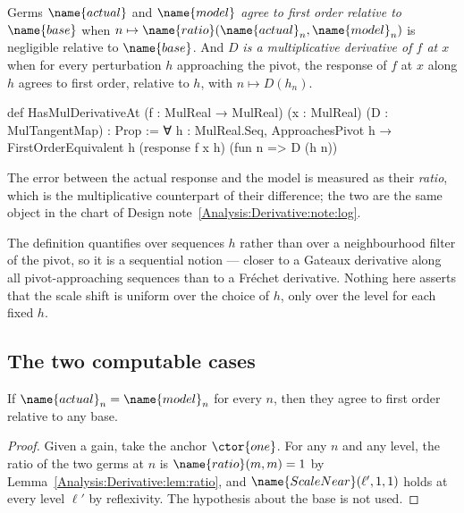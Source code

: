 \begin{definition}
\label{Analysis:Derivative:def:firstorder}
\label{Analysis:Derivative:def:hasderiv}
Germs $\name{actual}$ and $\name{model}$ \emph{agree to first order relative to}
$\name{base}$ when $n \mapsto \name{ratio}(\name{actual}_n, \name{model}_n)$ is
negligible relative to $\name{base}$.  And $D$ \emph{is a multiplicative
derivative of $f$ at $x$} when for every perturbation $h$ approaching the
pivot, the response of $f$ at $x$ along $h$ agrees to first order, relative to
$h$, with $n \mapsto D(h_n)$.
\end{definition}

\begin{leancode}
def HasMulDerivativeAt
    (f : MulReal → MulReal) (x : MulReal) (D : MulTangentMap) : Prop :=
  ∀ h : MulReal.Seq,
    ApproachesPivot h →
    FirstOrderEquivalent h
      (response f x h)
      (fun n => D (h n))
\end{leancode}

The error between the actual response and the model is measured as their
\emph{ratio}, which is the multiplicative counterpart of their difference; the
two are the same object in the chart of
Design note~\ref{Analysis:Derivative:note:log}.

\begin{remark}\label{Analysis:Derivative:rem:sequential}
The definition quantifies over sequences $h$ rather than over a neighbourhood
filter of the pivot, so it is a sequential notion --- closer to a Gateaux
derivative along all pivot-approaching sequences than to a Fréchet derivative.
Nothing here asserts that the scale shift is uniform over the choice of $h$,
only over the level for each fixed $h$.
\end{remark}

\subsection{The two computable cases}

\begin{lemma}\label{Analysis:Derivative:lem:exact}
If $\name{actual}_n = \name{model}_n$ for every $n$, then they agree to first
order relative to any base.
\end{lemma}

\begin{proof}
Given a gain, take the anchor $\ctor{one}$.  For any $n$ and any level, the
ratio of the two germs at $n$ is $\name{ratio}(m,m) = 1$ by
Lemma~\ref{Analysis:Derivative:lem:ratio}, and
$\name{ScaleNear}(\ell', 1, 1)$ holds at every level $\ell'$ by reflexivity.
The hypothesis about the base is not used.
\end{proof}

